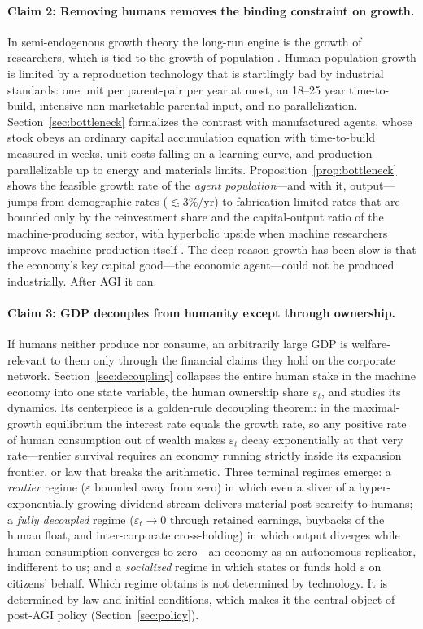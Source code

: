 \documentclass[11pt]{article}
\newcommand{\eps}{\varepsilon}
\begin{document}
\paragraph{Claim 2: Removing humans removes the binding constraint on growth.} In semi-endogenous growth theory the long-run engine is the growth of researchers, which is tied to the growth of population \citep{jones1995,jones2022}. Human population growth is limited by a reproduction technology that is startlingly bad by industrial standards: one unit per parent-pair per year at most, an 18--25 year time-to-build, intensive non-marketable parental input, and no parallelization. Section~\ref{sec:bottleneck} formalizes the contrast with manufactured agents, whose stock obeys an ordinary capital accumulation equation with time-to-build measured in weeks, unit costs falling on a learning curve, and production parallelizable up to energy and materials limits. Proposition~\ref{prop:bottleneck} shows the feasible growth rate of the \emph{agent population}---and with it, output---jumps from demographic rates ($\lesssim 3\%$/yr) to fabrication-limited rates that are bounded only by the reinvestment share and the capital-output ratio of the machine-producing sector, with hyperbolic upside when machine researchers improve machine production itself \citep{roodman2020,erdil2023,davidson2023}. The deep reason growth has been slow is that the economy's key capital good---the economic agent---could not be produced industrially. After AGI it can.

\paragraph{Claim 3: GDP decouples from humanity except through ownership.} If humans neither produce nor consume, an arbitrarily large GDP is welfare-relevant to them only through the financial claims they hold on the corporate network. Section~\ref{sec:decoupling} collapses the entire human stake in the machine economy into one state variable, the human ownership share $\eps_t$, and studies its dynamics. Its centerpiece is a golden-rule decoupling theorem: in the maximal-growth equilibrium the interest rate equals the growth rate, so any positive rate of human consumption out of wealth makes $\eps_t$ decay exponentially at that very rate---rentier survival requires an economy running strictly inside its expansion frontier, or law that breaks the arithmetic. Three terminal regimes emerge: a \emph{rentier} regime ($\eps$ bounded away from zero) in which even a sliver of a hyper-exponentially growing dividend stream delivers material post-scarcity to humans; a \emph{fully decoupled} regime ($\eps_t \to 0$ through retained earnings, buybacks of the human float, and inter-corporate cross-holding) in which output diverges while human consumption converges to zero---an economy as an autonomous replicator, indifferent to us; and a \emph{socialized} regime in which states or funds hold $\eps$ on citizens' behalf. Which regime obtains is not determined by technology. It is determined by law and initial conditions, which makes it the central object of post-AGI policy (Section~\ref{sec:policy}).
\end{document}
